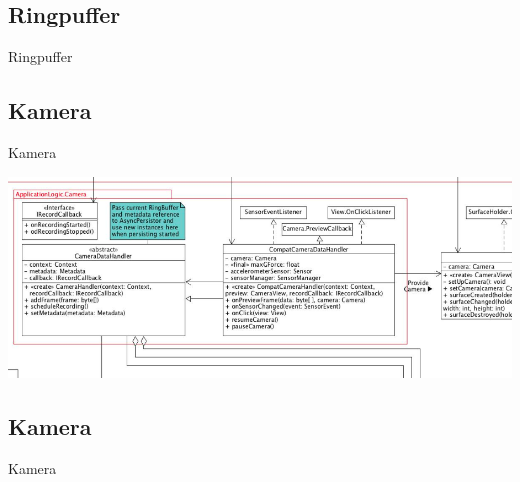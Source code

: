 \documentclass[19pt]{beamer}
\begin{document}
\subsection{Ringpuffer}
\begin{frame}{Ringpuffer}
\begin{center}
\end{center}
\end{frame}

\subsection{Kamera}
\begin{frame}{Kamera}
\begin{center}
\includegraphics[scale=0.33]{resources/camera_old.jpg}
\end{center}
\end{frame}
\subsection{Kamera}
\begin{frame}{Kamera}
\begin{center}
\end{center}
\end{frame}

\end{document}
